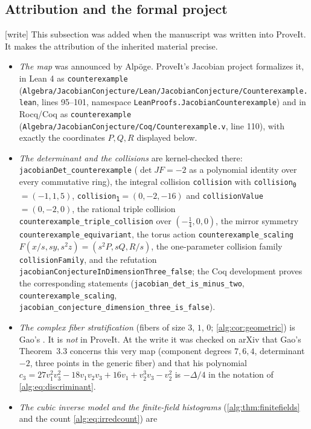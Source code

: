 \documentclass[11pt]{article}
\numberwithin{equation}{section}
\theoremstyle{plain}
\theoremstyle{plain}
\theoremstyle{plain}
\theoremstyle{definition}
\theoremstyle{definition}
\theoremstyle{definition}
\theoremstyle{remark}
\newcommand{\wtag}{\textup{[write]}}%
\newcommand{\rpath}[1]{\nolinkurl{#1}}
\begin{document}
\subsection{Attribution and the formal project}\label{alg:sub:attribution}
\wtag{} This subsection was added when the manuscript was written into
ProveIt. It makes the attribution of the inherited material precise.
\begin{itemize}[itemsep=2pt,topsep=3pt]\raggedright
\item \emph{The map} was announced by Alp\"oge. ProveIt's Jacobian project
formalizes it, in Lean 4 as \texttt{counterexample}
(\rpath{Algebra/JacobianConjecture/Lean/JacobianConjecture/Counterexample.lean},
lines 95--101, namespace \texttt{LeanProofs.JacobianCounterexample}) and
in Rocq/Coq as \texttt{counterexample}
(\rpath{Algebra/JacobianConjecture/Coq/Counterexample.v}, line 110),
with exactly the coordinates $P,Q,R$ displayed below.
\item \emph{The determinant and the collisions} are kernel-checked there:
\texttt{jacobianDet\_counterexample} ($\det JF=-2$ as a polynomial identity
over every commutative ring), the integral collision
\texttt{collision} with \texttt{collision\textsubscript{0}}${}=(-1,1,5)$,
\texttt{collision\textsubscript{1}}${}=(0,-2,-16)$ and
\texttt{collisionValue}${}=(0,-2,0)$, the rational triple collision
\texttt{counterexample\_triple\_collision} over $(-\tfrac14,0,0)$, the
mirror symmetry \texttt{counterexample\_equivariant}, the torus action
\texttt{counterexample\_scaling}
$F(x/s,sy,s^2z)=(s^2P,sQ,R/s)$, the one-parameter collision family
\texttt{collisionFamily}, and the refutation
\texttt{jacobianConjectureInDimensionThree\_false}; the Coq development
proves the corresponding statements (\texttt{jacobian\_det\_is\_minus\_two},
\texttt{counterexample\_scaling},
\texttt{jacobian\_conjecture\_dimension\_three\_is\_false}).
\item \emph{The complex fiber stratification} (fibers of size $3$, $1$,
$0$; \cref{alg:cor:geometric}) is Gao's \cite[Theorems 3.3--3.4]{gao}. It
is \emph{not} in ProveIt. At the write it was checked on arXiv that Gao's
Theorem~3.3 concerns this very map (component degrees $7,6,4$,
determinant $-2$, three points in the generic fiber) and that his
polynomial $c_3=27v_1^2v_3^2-18v_1v_2v_3+16v_1+v_2^3v_3-v_2^2$ is
$-\Delta/4$ in the notation of \eqref{alg:eq:discriminant}.
\item \emph{The cubic inverse model and the finite-field histograms}
(\cref{alg:thm:finitefields} and the count \eqref{alg:eq:irredcount}) are

\end{itemize}
\end{document}
